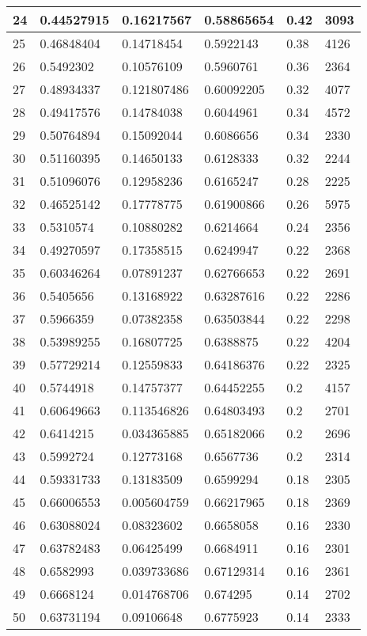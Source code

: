 \begin{longtable}{|l|l|l|l|l|l|}
24 & 0.44527915 & 0.16217567 & 0.58865654 & 0.42 & 3093 \\ \hline 
25 & 0.46848404 & 0.14718454 & 0.5922143 & 0.38 & 4126 \\ \hline 
26 & 0.5492302 & 0.10576109 & 0.5960761 & 0.36 & 2364 \\ \hline 
27 & 0.48934337 & 0.121807486 & 0.60092205 & 0.32 & 4077 \\ \hline 
28 & 0.49417576 & 0.14784038 & 0.6044961 & 0.34 & 4572 \\ \hline 
29 & 0.50764894 & 0.15092044 & 0.6086656 & 0.34 & 2330 \\ \hline 
30 & 0.51160395 & 0.14650133 & 0.6128333 & 0.32 & 2244 \\ \hline 
31 & 0.51096076 & 0.12958236 & 0.6165247 & 0.28 & 2225 \\ \hline 
32 & 0.46525142 & 0.17778775 & 0.61900866 & 0.26 & 5975 \\ \hline 
33 & 0.5310574 & 0.10880282 & 0.6214664 & 0.24 & 2356 \\ \hline 
34 & 0.49270597 & 0.17358515 & 0.6249947 & 0.22 & 2368 \\ \hline 
35 & 0.60346264 & 0.07891237 & 0.62766653 & 0.22 & 2691 \\ \hline 
36 & 0.5405656 & 0.13168922 & 0.63287616 & 0.22 & 2286 \\ \hline 
37 & 0.5966359 & 0.07382358 & 0.63503844 & 0.22 & 2298 \\ \hline 
38 & 0.53989255 & 0.16807725 & 0.6388875 & 0.22 & 4204 \\ \hline 
39 & 0.57729214 & 0.12559833 & 0.64186376 & 0.22 & 2325 \\ \hline 
40 & 0.5744918 & 0.14757377 & 0.64452255 & 0.2 & 4157 \\ \hline 
41 & 0.60649663 & 0.113546826 & 0.64803493 & 0.2 & 2701 \\ \hline 
42 & 0.6414215 & 0.034365885 & 0.65182066 & 0.2 & 2696 \\ \hline 
43 & 0.5992724 & 0.12773168 & 0.6567736 & 0.2 & 2314 \\ \hline 
44 & 0.59331733 & 0.13183509 & 0.6599294 & 0.18 & 2305 \\ \hline 
45 & 0.66006553 & 0.005604759 & 0.66217965 & 0.18 & 2369 \\ \hline 
46 & 0.63088024 & 0.08323602 & 0.6658058 & 0.16 & 2330 \\ \hline 
47 & 0.63782483 & 0.06425499 & 0.6684911 & 0.16 & 2301 \\ \hline 
48 & 0.6582993 & 0.039733686 & 0.67129314 & 0.16 & 2361 \\ \hline 
49 & 0.6668124 & 0.014768706 & 0.674295 & 0.14 & 2702 \\ \hline 
50 & 0.63731194 & 0.09106648 & 0.6775923 & 0.14 & 2333 \\ \hline 
\end{longtable}